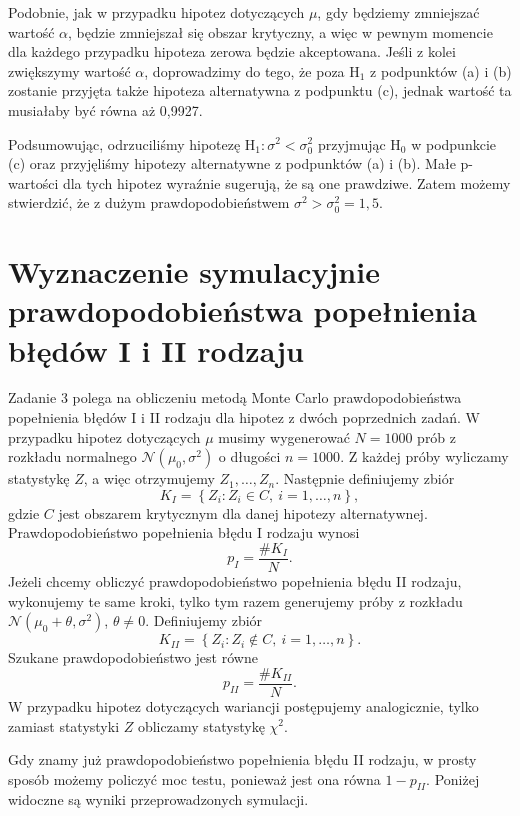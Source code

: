 \documentclass[12pt]{mwart}
\begin{document}
	\noindent Podobnie, jak w przypadku hipotez dotyczących $\mu$, gdy będziemy zmniejszać wartość $\alpha$, będzie zmniejszał się obszar krytyczny, a więc w pewnym momencie dla każdego przypadku hipoteza zerowa będzie akceptowana. Jeśli z kolei zwiększymy wartość $\alpha$, doprowadzimy do tego, że poza $\mathrm{H_1}$ z podpunktów (a) i (b) zostanie przyjęta także hipoteza alternatywna z podpunktu (c), jednak wartość ta musiałaby być równa aż 0,9927. \vspace{2mm}
	
	\noindent Podsumowując, odrzuciliśmy hipotezę $\mathrm{H_1}:\sigma^2 < \sigma_0^2$ przyjmując $\mathrm{H_0}$ w podpunkcie (c) oraz przyjęliśmy hipotezy alternatywne z podpunktów (a) i (b). Małe p-wartości dla tych hipotez wyraźnie sugerują, że są one prawdziwe. Zatem możemy stwierdzić, że z dużym prawdopodobieństwem $\sigma^2 > \sigma_0^2 = 1,5$.
	
	
	
	\section{Wyznaczenie symulacyjnie prawdopodobieństwa popełnienia błędów I i II rodzaju}
	
	\noindent Zadanie 3 polega na obliczeniu metodą Monte Carlo prawdopodobieństwa popełnienia błędów I i II rodzaju dla hipotez z dwóch poprzednich zadań. W przypadku hipotez dotyczących $\mu$ musimy wygenerować $N = 1000$ prób z rozkładu normalnego $\mathcal{N}(\mu_0, \sigma^2)$ o długości $n = 1000$. Z każdej próby wyliczamy statystykę $Z$, a więc otrzymujemy $Z_1, \dots, Z_n$. Następnie definiujemy zbiór
	$$ K_I = \left\{ Z_i: Z_i \in C, \ i = 1,\dots,n \right\}, $$
	gdzie $C$ jest obszarem krytycznym dla danej hipotezy alternatywnej. Prawdopodobieństwo popełnienia błędu I rodzaju wynosi
	$$ p_I = \frac{\#K_I}{N}. $$
	Jeżeli chcemy obliczyć prawdopodobieństwo popełnienia błędu II rodzaju, wykonujemy te same kroki, tylko tym razem generujemy próby z rozkładu $\mathcal{N}(\mu_0 + \theta, \sigma^2)$, $\theta \neq 0$. Definiujemy zbiór
	$$ K_{II} = \left\{ Z_i: Z_i \notin C, \ i = 1,\dots,n \right\}. $$
	Szukane prawdopodobieństwo jest równe
	$$ p_{II} = \frac{\#K_{II}}{N}. $$
	W przypadku hipotez dotyczących wariancji postępujemy analogicznie, tylko zamiast statystyki $Z$ obliczamy statystykę $\chi^2$.
	
	\noindent Gdy znamy już prawdopodobieństwo popełnienia błędu II rodzaju, w prosty sposób możemy policzyć moc testu, ponieważ jest ona równa $1 - p_{II}$. Poniżej widoczne są wyniki przeprowadzonych symulacji.\vspace{4mm}
	
\end{document}
